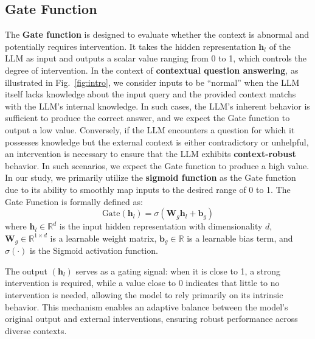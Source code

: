\subsection{Gate Function} 
\label{Sec:gate}
The \textbf{Gate function} is designed to evaluate whether the context is abnormal and potentially requires intervention. It takes the hidden representation \( \mathbf{h}_l \)  of the LLM as input and outputs a scalar value ranging from 0 to 1, which controls the degree of intervention. In the context of \textbf{contextual question answering}, as illustrated in Fig.~\ref{fig:intro}, we consider inputs to be ``normal'' when the LLM itself lacks knowledge about the input query and the provided context matchs with the LLM's internal knowledge. In such cases, the LLM's inherent behavior is sufficient to produce the correct answer, and we expect the Gate function to output a low value.  Conversely, if the LLM encounters a question for which it possesses knowledge but the external context is either contradictory or unhelpful, an intervention is necessary to ensure that the LLM exhibits \textbf{context-robust} behavior. In such scenarios, we expect the Gate function to produce a high value.  In our study, we primarily utilize the \textbf{sigmoid function} as the Gate function due to its ability to smoothly map inputs to the desired range of 0 to 1. The Gate Function is formally defined as:
\begin{equation}
    \text{Gate}(\mathbf{h}_l) = \sigma(\mathbf{W}_g \mathbf{h}_l + \mathbf{b}_g)
    \label{eq:gate}
\end{equation}
where \( \mathbf{h}_l \in \mathbb{R}^{d} \) is the input hidden representation with dimensionality \( d \), \( \mathbf{W}_g \in \mathbb{R}^{1 \times d} \) is a learnable weight matrix, \( \mathbf{b}_g \in \mathbb{R} \) is a learnable bias term, and \( \sigma(\cdot) \) is the Sigmoid activation function.


The output $(\mathbf{h}_l)$ serves as a gating signal: when it is close to 1, a strong intervention is required, while a value close to 0 indicates that little to no intervention is needed, allowing the model to rely primarily on its intrinsic behavior. This mechanism enables an adaptive balance between the model's original output and external interventions, ensuring robust performance across diverse contexts. 




